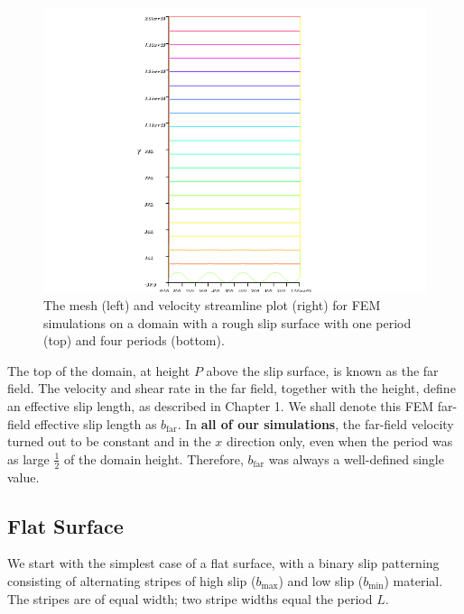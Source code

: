 \documentclass[12pt, a4paper, twoside, openright]{book}
\newcommand{\bmin}{\ensuremath{b_{\mathrm{min}}}}
\newcommand{\bmax}{\ensuremath{b_{\mathrm{max}}}}
\newcommand{\bfar}{\ensuremath{b_{\mathrm{far}}}}
\begin{document}
\begin{figure}[ht]
\begin{center}
\includegraphics[scale=0.5, trim=4cm 0cm 4cm 0cm, clip=true]{FEM_streamlines_4.png}
\end{center}

\caption{The mesh (left) and velocity streamline plot (right) for FEM simulations on a domain with a rough slip surface with one period (top) and four periods (bottom).}
\label{FEMmesh4}
\end{figure}


\vspace{1em}
The top of the domain, at height $P$ above the slip surface, is known as the far field.  The velocity and shear rate in the far field, together with the height, define an effective slip length, as described in Chapter 1.  We shall denote this FEM far-field effective slip length as $\bfar$.  In \textbf{all of our simulations}, the far-field velocity turned out to be constant and in the $x$ direction only, even when the period was as large $\frac{1}{2}$ of the domain height.  Therefore, $\bfar$ was always a well-defined single value.



\subsection{Flat Surface}

We start with the simplest case of a flat surface, with a binary slip patterning consisting of alternating stripes of high slip ($\bmax$) and low slip ($\bmin$) material.  The stripes are of equal width; two stripe widths equal the period $L$.

\clearpage
\end{document}
